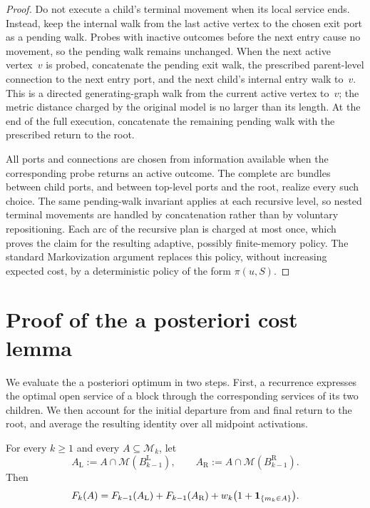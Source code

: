 \documentclass[12pt,a4paper,oneside]{report}
\begin{document}
\begin{proof}
Do not execute a child's terminal movement when its local service ends.
Instead, keep the internal walk from the last active vertex to the chosen exit
port as a pending walk.  Probes with inactive outcomes before the next entry cause no
movement, so the pending walk remains unchanged.  When the next active
vertex~$v$ is probed, concatenate the pending exit walk, the prescribed
parent-level connection to the next entry port, and the next child's internal
entry walk to~$v$.  This is a directed generating-graph walk from the current
active vertex to~$v$; the metric distance charged by the original model is no
larger than its length.  At the end of the full execution, concatenate the
remaining pending walk with the prescribed return to the root.

All ports and connections are chosen from information available when the
corresponding probe returns an active outcome.  The complete arc bundles between child
ports, and between top-level ports and the root, realize every such choice.
The same pending-walk invariant applies at each recursive level, so nested
terminal movements are handled by concatenation rather than by voluntary
repositioning.  Each arc of the recursive plan is charged at most once, which
proves the claim for the resulting adaptive, possibly finite-memory policy.
The standard Markovization argument replaces this policy, without
increasing expected cost, by a deterministic policy of the form $\pi(u,S)$.
\end{proof}

\section{Proof of the a posteriori cost lemma}\label{sec:recursive-posterior-proof}

We evaluate the a posteriori optimum in two steps.  First, a recurrence
expresses the optimal open service of a block through the corresponding
services of its two children.  We then account for the initial departure from
and final return to the root, and average the resulting identity over all
midpoint activations.

\begin{lemma}\label{lem:post-rec}
For every $k\ge1$ and every $A\subseteq\mathcal M_k$, let
\[
    A_{\mathrm L}:=A\cap\mathcal M(B_{k-1}^{\mathrm L}),
    \qquad
    A_{\mathrm R}:=A\cap\mathcal M(B_{k-1}^{\mathrm R}).
\]
Then
\begin{equation}\label{eq:post-rec}
    F_k(A)
    =
    F_{k-1}(A_{\mathrm L})+F_{k-1}(A_{\mathrm R})
    +w_k\bigl(1+\mathbf{1}_{\{m_k\in A\}}\bigr).
\end{equation}
\end{lemma}
\end{document}
